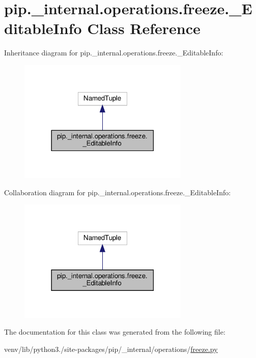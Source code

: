 \hypertarget{classpip_1_1__internal_1_1operations_1_1freeze_1_1__EditableInfo}{}\section{pip.\+\_\+internal.\+operations.\+freeze.\+\_\+\+Editable\+Info Class Reference}
\label{classpip_1_1__internal_1_1operations_1_1freeze_1_1__EditableInfo}


Inheritance diagram for pip.\+\_\+internal.\+operations.\+freeze.\+\_\+\+Editable\+Info\+:
\nopagebreak
\begin{figure}[H]
\begin{center}
\leavevmode
\includegraphics[width=230pt]{classpip_1_1__internal_1_1operations_1_1freeze_1_1__EditableInfo__inherit__graph}
\end{center}
\end{figure}


Collaboration diagram for pip.\+\_\+internal.\+operations.\+freeze.\+\_\+\+Editable\+Info\+:
\nopagebreak
\begin{figure}[H]
\begin{center}
\leavevmode
\includegraphics[width=230pt]{classpip_1_1__internal_1_1operations_1_1freeze_1_1__EditableInfo__coll__graph}
\end{center}
\end{figure}


The documentation for this class was generated from the following file\+:\begin{DoxyCompactItemize}
\item 
venv/lib/python3./site-\/packages/pip/\+\_\+internal/operations/\hyperlink{operations_2freeze_8py}{freeze.\+py}\end{DoxyCompactItemize}
